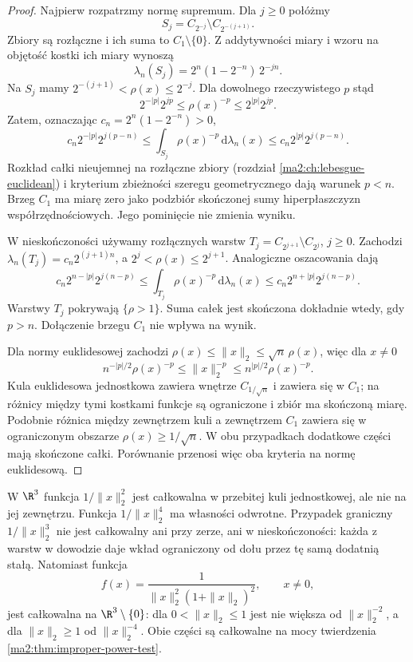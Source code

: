 \begin{proof}
Najpierw rozpatrzmy normę supremum.
Dla $j\ge0$ połóżmy
\[
 S_j=C_{2^{-j}}\setminus C_{2^{-(j+1)}}.
\]
Zbiory są rozłączne i ich suma to
$C_1\setminus\{0\}$. Z addytywności miary i wzoru
na objętość kostki ich miary wynoszą
\[
 \lambda_n(S_j)
 =2^n(1-2^{-n})\,2^{-jn}.
\]
Na $S_j$ mamy $2^{-(j+1)}<\rho(x)\le2^{-j}$.
Dla dowolnego rzeczywistego $p$ stąd
\[
 2^{-|p|}2^{jp}\le \rho(x)^{-p}
 \le 2^{|p|}2^{jp}.
\]
Zatem, oznaczając $c_n=2^n(1-2^{-n})>0$,
\[
 c_n2^{-|p|}2^{j(p-n)}
 \le\int_{S_j}\rho(x)^{-p}\,\mathrm d\lambda_n(x)
 \le c_n2^{|p|}2^{j(p-n)}.
\]
Rozkład całki nieujemnej na rozłączne
zbiory (rozdział \ref{ma2:ch:lebesgue-euclidean})
i kryterium zbieżności szeregu geometrycznego
dają warunek $p<n$.
Brzeg $C_1$ ma miarę zero jako podzbiór
skończonej sumy hiperpłaszczyzn współrzędnościowych.
Jego pominięcie nie zmienia wyniku.

W nieskończoności używamy rozłącznych
warstw $T_j=C_{2^{j+1}}\setminus C_{2^j}$,
$j\ge0$. Zachodzi
$\lambda_n(T_j)=c_n2^{(j+1)n}$, a
$2^j<\rho(x)\le2^{j+1}$.
Analogiczne oszacowania dają
\[
 c_n2^{n-|p|}2^{j(n-p)}
 \le\int_{T_j}\rho(x)^{-p}\,\mathrm d\lambda_n(x)
 \le c_n2^{n+|p|}2^{j(n-p)}.
\]
Warstwy $T_j$ pokrywają $\{\rho>1\}$.
Suma całek jest skończona dokładnie wtedy,
gdy $p>n$. Dołączenie brzegu $C_1$ nie wpływa
na wynik.

Dla normy euklidesowej zachodzi
$\rho(x)\le\|x\|_2\le\sqrt n\,\rho(x)$,
więc dla $x\ne0$
\[
 n^{-|p|/2}\rho(x)^{-p}
 \le\|x\|_2^{-p}
 \le n^{|p|/2}\rho(x)^{-p}.
\]
Kula euklidesowa jednostkowa zawiera wnętrze
$C_{1/\sqrt n}$ i zawiera się w $C_1$;
na różnicy między tymi kostkami funkcje
są ograniczone i zbiór ma skończoną miarę.
Podobnie różnica między zewnętrzem kuli
a zewnętrzem $C_1$ zawiera się w ograniczonym
obszarze $\rho(x)\ge1/\sqrt n$.
W obu przypadkach dodatkowe części mają
skończone całki. Porównanie przenosi więc
oba kryteria na normę euklidesową.
\end{proof}

\begin{przyklad}
\label{ma2:ex:improper-power-dimensions}
W $\R^3$ funkcja $1/\|x\|_2^2$ jest
całkowalna w przebitej kuli jednostkowej,
ale nie na jej zewnętrzu.
Funkcja $1/\|x\|_2^4$ ma własności odwrotne.
Przypadek graniczny $1/\|x\|_2^3$
nie jest całkowalny ani przy zerze, ani
w nieskończoności: każda z warstw
w dowodzie daje wkład ograniczony od dołu
przez tę samą dodatnią stałą.
Natomiast funkcja
\[
 f(x)=\frac{1}{\|x\|_2^2(1+\|x\|_2)^2},
 \qquad x\ne0,
\]
jest całkowalna na $\R^3\setminus\{0\}$:
dla $0<\|x\|_2\le1$ jest nie większa od
$\|x\|_2^{-2}$, a dla $\|x\|_2\ge1$
od $\|x\|_2^{-4}$. Obie części są całkowalne
na mocy twierdzenia \ref{ma2:thm:improper-power-test}.
\end{przyklad}

